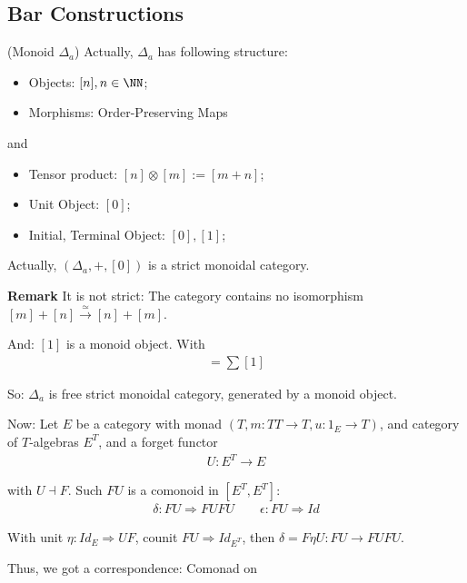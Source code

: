 \documentclass[Total.tex]{subfiles}
\begin{document}
			\subsection{Bar Constructions}
			\begin{Def}
				(Monoid $\Delta_a$) Actually, $\Delta_a$ has following structure:
				\begin{itemize}
					\item Objects: $[n],n\in \NN$;
					\item Morphisms: Order-Preserving Maps
				\end{itemize}
				
				and
				\begin{itemize}
					\item Tensor product: $[n]\otimes [m]:=[m+n]$;
					\item Unit Object: $[0]$;
					\item Initial, Terminal Object: $[0],[1]$;
				\end{itemize}
				
				Actually, $(\Delta_a,+,[0])$ is a strict monoidal category.
				
				\textbf{Remark} It is not strict: The category contains no isomorphism $[m]+[n]\stackrel{\simeq}{\rightarrow} [n]+[m]$.
				
				And: $[1]$ is a monoid object. With
				\begin{gather*}
					[n]=\sum [1]
				\end{gather*}
				
				So: $\Delta_a$ is free strict monoidal category, generated by a monoid object.
			\end{Def}
			
			Now: Let $E$ be a category with monad $(T,m:TT\rightarrow T,u:1_E\rightarrow T)$, and category of $T$-algebras $E^T$, and a forget functor
			\begin{gather*}
				U:E^T\rightarrow E
			\end{gather*}
			
			with $U\dashv F$. Such $FU$ is a comonoid in $[E^T,E^T]$:
			\begin{gather*}
				\delta:FU\Rightarrow FUFU\qquad \epsilon:FU\Rightarrow Id
			\end{gather*}
			
			With unit $\eta:Id_E\Rightarrow UF$, counit $FU\Rightarrow Id_{E^T}$, then $\delta=F\eta U:FU\rightarrow FUFU$.
			
			Thus, we got a correspondence: Comonad on 
			
\end{document}
